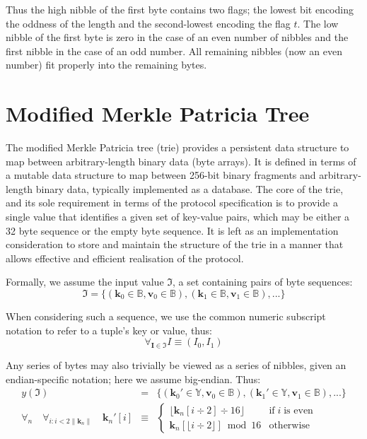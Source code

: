 \documentclass[9pt,oneside]{amsart}
\begin{document}
Thus the high nibble of the first byte contains two flags; the lowest bit encoding the oddness of the length and the second-lowest encoding the flag $t$. The low nibble of the first byte is zero in the case of an even number of nibbles and the first nibble in the case of an odd number. All remaining nibbles (now an even number) fit properly into the remaining bytes.

\section{Modified Merkle Patricia Tree}\label{app:trie}\hypertarget{trie}{}
The modified Merkle Patricia tree (trie) provides a persistent data structure to map between arbitrary-length binary data (byte arrays). It is defined in terms of a mutable data structure to map between 256-bit binary fragments and arbitrary-length binary data, typically implemented as a database. The core of the trie, and its sole requirement in terms of the protocol specification is to provide a single value that identifies a given set of key-value pairs, which may be either a 32 byte sequence or the empty byte sequence. It is left as an implementation consideration to store and maintain the structure of the trie in a manner that allows effective and efficient realisation of the protocol.

Formally, we assume the input value $\mathfrak{I}$, a set containing pairs of byte sequences:
\begin{equation}
\mathfrak{I} = \{ (\mathbf{k}_0 \in \mathbb{B}, \mathbf{v}_0 \in \mathbb{B}), (\mathbf{k}_1 \in \mathbb{B}, \mathbf{v}_1 \in \mathbb{B}), ... \}
\end{equation}

When considering such a sequence, we use the common numeric subscript notation to refer to a tuple's key or value, thus:
\begin{equation}
\forall_{\mathbf{I} \in \mathfrak{I}} I \equiv (I_0, I_1)
\end{equation}

Any series of bytes may also trivially be viewed as a series of nibbles, given an endian-specific notation; here we assume big-endian. Thus:
\begin{eqnarray}
y(\mathfrak{I}) & = & \{ (\mathbf{k}_0' \in \mathbb{Y}, \mathbf{v}_0 \in \mathbb{B}), (\mathbf{k}_1' \in \mathbb{Y}, \mathbf{v}_1 \in \mathbb{B}), ... \} \\
\forall_{n} \quad \forall_{i: i < 2\lVert\mathbf{k}_{n}\rVert} \quad \mathbf{k}_{n}'[i] & \equiv &
\begin{cases}
\lfloor \mathbf{k}_{n}[i \div 2] \div 16 \rfloor & \text{if} \; i \; \text{is even} \\
\mathbf{k}_{n}[\lfloor i \div 2 \rfloor] \bmod 16 & \text{otherwise}
\end{cases}
\end{eqnarray}
\end{document}
